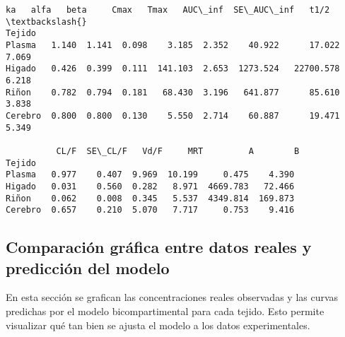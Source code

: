 \documentclass[11pt]{article}
\begin{document}
    \begin{Verbatim}[commandchars=\\\{\}]
            ka   alfa   beta     Cmax   Tmax   AUC\_inf  SE\_AUC\_inf   t1/2  \textbackslash{}
Tejido
Plasma   1.140  1.141  0.098    3.185  2.352    40.922      17.022  7.069
Higado   0.426  0.399  0.111  141.103  2.653  1273.524   22700.578  6.218
Riñon    0.782  0.794  0.181   68.430  3.196   641.877      85.610  3.838
Cerebro  0.800  0.800  0.130    5.550  2.714    60.887      19.471  5.349

          CL/F  SE\_CL/F   Vd/F     MRT         A        B
Tejido
Plasma   0.977    0.407  9.969  10.199     0.475    4.390
Higado   0.031    0.560  0.282   8.971  4669.783   72.466
Riñon    0.062    0.008  0.345   5.537  4349.814  169.873
Cerebro  0.657    0.210  5.070   7.717     0.753    9.416
    \end{Verbatim}

    \subsection{Comparación gráfica entre datos reales y predicción del
modelo}\label{comparaciuxf3n-gruxe1fica-entre-datos-reales-y-predicciuxf3n-del-modelo}

En esta sección se grafican las concentraciones reales observadas y las
curvas predichas por el modelo bicompartimental para cada tejido. Esto
permite visualizar qué tan bien se ajusta el modelo a los datos
experimentales.
\end{document}
